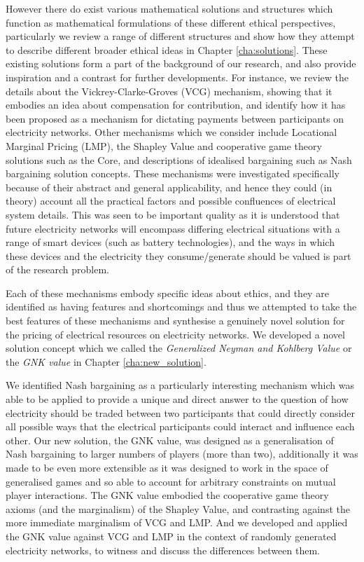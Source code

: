 However there do exist various mathematical solutions and structures which function as mathematical formulations of these different ethical perspectives, particularly we review a range of different structures and show how they attempt to describe different broader ethical ideas in Chapter \ref{cha:solutions}.
These existing solutions form a part of the background of our research, and also provide inspiration and a contrast for further developments.
For instance, we review the details about the Vickrey-Clarke-Groves (VCG) mechanism, showing that it embodies an idea about compensation for contribution, and identify how it has been proposed as a mechanism for dictating payments between participants on electricity networks.
Other mechanisms which we consider include Locational Marginal Pricing (LMP), the Shapley Value and cooperative game theory solutions such as the Core, and descriptions of idealised bargaining such as Nash bargaining solution concepts.
These mechanisms were investigated specifically because of their abstract and general applicability, and hence they could (in theory) account all the practical factors and possible confluences of electrical system details.
This was seen to be important quality as it is understood that future electricity networks will encompass differing electrical situations with a range of smart devices (such as battery technologies), and the ways in which these devices and the electricity they consume/generate should be valued is part of the research problem.


Each of these mechanisms embody specific ideas about ethics, and they are identified as having features and shortcomings and thus we attempted to take the best features of these mechanisms and synthesise a genuinely novel solution for the pricing of electrical resources on electricity networks.
We developed a novel solution concept which we called the \textit{Generalized Neyman and Kohlberg Value} or the \textit{GNK value} in Chapter \ref{cha:new_solution}.

We identified Nash bargaining as a particularly interesting mechanism which was able to be applied to provide a unique and direct answer to the question of how electricity should be traded between two participants that could directly consider all possible ways that the electrical participants could interact and influence each other.
Our new solution, the GNK value, was designed as a generalisation of Nash bargaining to larger numbers of players (more than two), additionally it was made to be even more extensible as it was designed to work in the space of generalised games and so able to account for arbitrary constraints on mutual player interactions.
The GNK value embodied the cooperative game theory axioms (and the marginalism) of the Shapley Value, and contrasting against the more immediate marginalism of VCG and LMP.
And we developed and applied the GNK value against VCG and LMP in the context of randomly generated electricity networks, to witness and discuss the differences between them.

